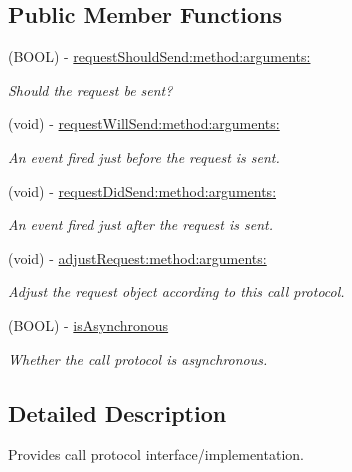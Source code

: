 \subsection*{Public Member Functions}
\begin{DoxyCompactItemize}
\item 
(BOOL) -\/ \hyperlink{protocol_r_m_call_protocol-p_a5656dcb18011d94f1d2de1e695741279}{requestShouldSend:method:arguments:}
\begin{DoxyCompactList}\small\item\em Should the request be sent? \item\end{DoxyCompactList}\item 
(void) -\/ \hyperlink{protocol_r_m_call_protocol-p_a33f653fd32cbeae77545d77d7d80575c}{requestWillSend:method:arguments:}
\begin{DoxyCompactList}\small\item\em An event fired just before the request is sent. \item\end{DoxyCompactList}\item 
(void) -\/ \hyperlink{protocol_r_m_call_protocol-p_ae502b8d3070e9de7a6b125b16a8db5cf}{requestDidSend:method:arguments:}
\begin{DoxyCompactList}\small\item\em An event fired just after the request is sent. \item\end{DoxyCompactList}\item 
(void) -\/ \hyperlink{protocol_r_m_call_protocol-p_ab3c27370fb06c6083131b5338dcabe2f}{adjustRequest:method:arguments:}
\begin{DoxyCompactList}\small\item\em Adjust the request object according to this call protocol. \item\end{DoxyCompactList}\item 
(BOOL) -\/ \hyperlink{protocol_r_m_call_protocol-p_ae4432e31198f1f116480ec4f1ed46d92}{isAsynchronous}
\begin{DoxyCompactList}\small\item\em Whether the call protocol is asynchronous. \item\end{DoxyCompactList}\end{DoxyCompactItemize}


\subsection{Detailed Description}
Provides call protocol interface/implementation. 

